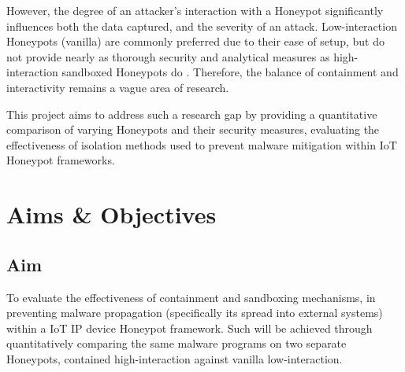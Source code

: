 \documentclass[a4paper,12pt,oneside]{book}			%
\begin{document}
However, the degree of an attacker’s interaction with a Honeypot significantly influences both the data captured, and the severity of an attack. Low-interaction Honeypots (vanilla) are commonly preferred due to their ease of setup, but do not provide nearly as thorough security and analytical measures as high-interaction sandboxed Honeypots do \textit{\citep{Kocaogullar2023honeypots}}. Therefore, the balance of containment and interactivity remains a vague area of research.

This project aims to address such a research gap by providing a quantitative comparison of varying Honeypots and their security measures, evaluating the effectiveness of isolation methods used to prevent malware mitigation within IoT Honeypot frameworks. 


\section{Aims \&{} Objectives}\label{sec:aimAndObjectives}

\subsection{Aim}\label{sec:aim}

To evaluate the effectiveness of containment and sandboxing mechanisms, in preventing malware propagation (specifically its spread into external systems) within a IoT IP device Honeypot framework. Such will be achieved through quantitatively comparing the same malware programs on two separate Honeypots, contained high-interaction against vanilla low-interaction. 
\end{document}
